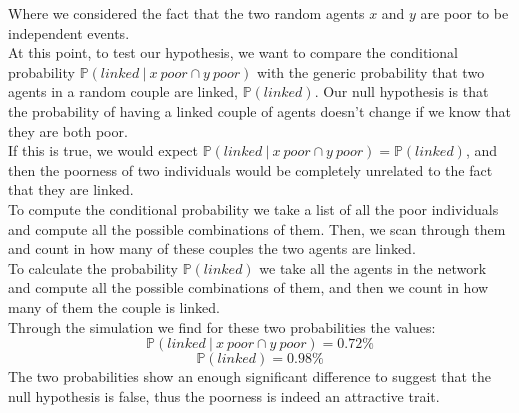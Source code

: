 Where we considered the fact that the two random agents $x$ and $y$ are poor to be independent events. \\
At this point, to test our hypothesis, we want to compare the conditional probability $\mathbb{P}(linked \ \vert \ x \ poor \cap y \ poor)$ with the generic probability that two agents in a random couple are linked, $\mathbb{P}(linked)$.
Our null hypothesis is that the probability of having a linked couple of agents doesn't change if we know that they are both poor. \\
If this is true, we would expect $\mathbb{P}(linked \ \vert \ x \ poor \cap y \ poor) = \mathbb{P}(linked)$, and then the poorness of two individuals would be completely unrelated to the fact that they are linked. \\
To compute the conditional probability we take a list of all the poor individuals and compute all the possible combinations of them.
Then, we scan through them and count in how many of these couples the two agents are linked. \\
To calculate the probability $\mathbb{P}(linked)$ we take all the agents in the network and compute all the possible combinations of them, and then we count in how many of them the couple is linked. \\
Through the simulation we find for these two probabilities the values:
\begin{equation*}
	\mathbb{P}(linked \ \vert \ x \ poor \cap y \ poor) = 0.72\%
\end{equation*}
\begin{equation*}
	\mathbb{P}(linked) = 0.98\%
\end{equation*}
The two probabilities show an enough significant difference to suggest that the null hypothesis is false, thus the poorness is indeed an attractive trait.
